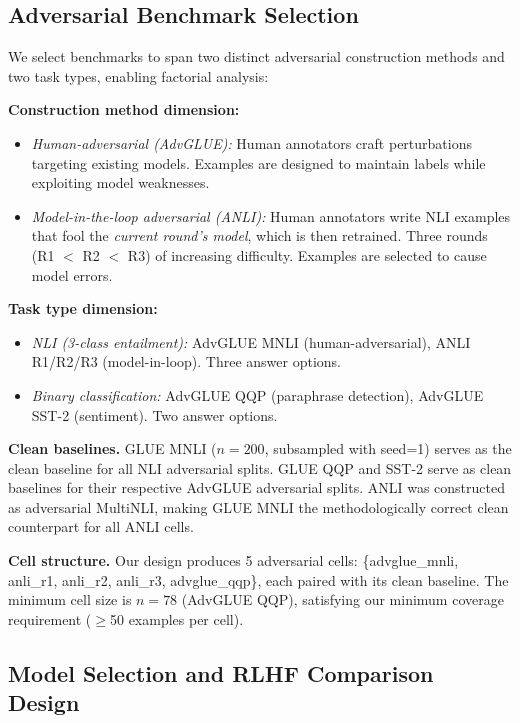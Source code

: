 \subsection{Adversarial Benchmark Selection}

We select benchmarks to span two distinct adversarial construction methods and two task types, enabling factorial analysis:

\textbf{Construction method dimension:}
\begin{itemize}
  \item \textit{Human-adversarial (AdvGLUE):} Human annotators craft perturbations targeting existing models. Examples are designed to maintain labels while exploiting model weaknesses.
  \item \textit{Model-in-the-loop adversarial (ANLI):} Human annotators write NLI examples that fool the \textit{current round's model}, which is then retrained. Three rounds (R1 $<$ R2 $<$ R3) of increasing difficulty. Examples are selected to cause model errors.
\end{itemize}

\textbf{Task type dimension:}
\begin{itemize}
  \item \textit{NLI (3-class entailment):} AdvGLUE MNLI (human-adversarial), ANLI R1/R2/R3 (model-in-loop). Three answer options.
  \item \textit{Binary classification:} AdvGLUE QQP (paraphrase detection), AdvGLUE SST-2 (sentiment). Two answer options.
\end{itemize}

\textbf{Clean baselines.} GLUE MNLI ($n=200$, subsampled with seed=1) serves as the clean baseline for all NLI adversarial splits. GLUE QQP and SST-2 serve as clean baselines for their respective AdvGLUE adversarial splits. ANLI was constructed as adversarial MultiNLI, making GLUE MNLI the methodologically correct clean counterpart for all ANLI cells.

\textbf{Cell structure.} Our design produces 5 adversarial cells: \{advglue\_mnli, anli\_r1, anli\_r2, anli\_r3, advglue\_qqp\}, each paired with its clean baseline. The minimum cell size is $n=78$ (AdvGLUE QQP), satisfying our minimum coverage requirement ($\geq$50 examples per cell).

\subsection{Model Selection and RLHF Comparison Design}

